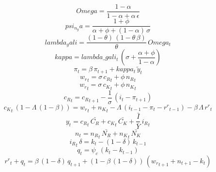 \documentclass[10pt,a4paper]{article}
\begin{document}
\footnotesize
\begin{dmath*}
Omega = \frac{1-{\alpha}}{1-{\alpha}+{\alpha}\, {\epsilon}}
\end{dmath*}
\begin{dmath*}
psi_n_ya = \frac{1+{\phi}}{{\alpha}+{\phi}+\left(1-{\alpha}\right)\, {\sigma}}
\end{dmath*}
\begin{dmath*}
lambda_gali = \frac{\left(1-{\theta}\right)\, \left(1-{\theta}\, {\beta}\right)}{{\theta}}\, Omega_{t}
\end{dmath*}
\begin{dmath*}
kappa = lambda\_gali_{t}\, \left({\sigma}+\frac{{\alpha}+{\phi}}{1-{\alpha}}\right)
\end{dmath*}
\begin{dmath}
{\pi}_{t}={\beta}\, {\pi}_{t+1}+kappa_{t}\, {\tilde y}_{t}
\end{dmath}
\begin{dmath}
{w_r}_{t}={\sigma}\, {c_R}_{t}+{\phi}\, {n_R}_{t}
\end{dmath}
\begin{dmath}
{w_r}_{t}={\sigma}\, {c_K}_{t}+{\phi}\, {n_K}_{t}
\end{dmath}
\begin{dmath}
{c_R}_{t}={c_R}_{t+1}-\frac{1}{{\sigma}}\, \left({i}_{t}-{\pi}_{t+1}\right)
\end{dmath}
\begin{dmath}
{c_K}_{t}\, \left(1-{\Lambda}\, \left(1-{\beta}\right)\right)={w_r}_{t}+{n_K}_{t}-{\Lambda}\, \left({i}_{t-1}-{\pi}_{t}-{r^r}_{t-1}\right)-{\beta}\, {\Lambda}\, {r^r}_{t}
\end{dmath}
\begin{dmath}
{y}_{t}={c_R}_{t}\, \bar{C_R}+{c_K}_{t}\, \bar{C_K}+{\frac{\bar{I}}{\bar{Y}}}\, {i_R}_{t}
\end{dmath}
\begin{dmath}
{n}_{t}={n_R}_{t}\, \bar{N_R}+{n_K}_{t}\, \bar{N_K}
\end{dmath}
\begin{dmath}
{i_R}_{t}\, {\delta}={k}_{t}-\left(1-{\delta}\right)\, {k}_{t-1}
\end{dmath}
\begin{dmath}
{q}_{t}={\psi_c}\, \left({k}_{t}-{k}_{t-1}\right)
\end{dmath}
\begin{dmath}
{r^r}_{t}+{q}_{t}={\beta}\, \left(1-{\delta}\right)\, {q}_{t+1}+\left(1-{\beta}\, \left(1-{\delta}\right)\right)\, \left({w_r}_{t+1}+{n}_{t+1}-{k}_{t}\right)
\end{dmath}
\end{document}
